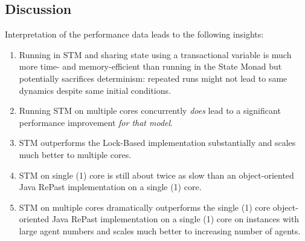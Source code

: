 
\subsection{Discussion}
Interpretation of the performance data leads to the following insights:
\begin{enumerate}
	\item Running in STM and sharing state using a transactional variable is much more time- and memory-efficient than running in the State Monad but potentially sacrifices determinism: repeated runs might not lead to same dynamics despite same initial conditions.
	\item Running STM on multiple cores concurrently \textit{does} lead to a significant performance improvement \textit{for that model}.
	\item STM outperforms the Lock-Based implementation substantially and scales much better to multiple cores.
	\item STM on single (1) core is still about twice as slow than an object-oriented Java RePast implementation on a single (1) core.
	\item STM on multiple cores dramatically outperforms the single (1) core object-oriented Java RePast implementation on a single (1) core on instances with large agent numbers and scales much better to increasing number of agents.
\end{enumerate}